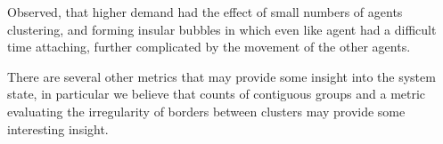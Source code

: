 \documentclass[sigplan,nonacm]{acmart}
\begin{document}
Observed, that higher demand had the effect of small numbers of agents clustering, and forming insular bubbles in which even like agent had a difficult time
attaching, further complicated by the movement of the other agents.




There are several other metrics that may provide some insight into the system state, in particular we believe that 
counts of contiguous groups and a metric evaluating the irregularity of borders between clusters may provide some interesting insight.



\end{document}
